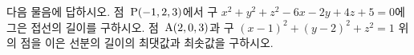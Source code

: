 다음 물음에 답하시오.
 점~$\mathrm{P}(-1{,}\mkern3mu\mathopen{}2{,}\mkern3mu\mathopen{}3)$에서 구 $x^2+y^2+z^2-6x-2y+4z+5=0$에 그은 접선의 길이를 구하시오.
 점~$\mathrm{A}(2{,}\mkern3mu\mathopen{}0{,}\mkern3mu\mathopen{}3)$과 구 $(x-1)^2+(y-2)^2+z^2=1$ 위의 점을 이은 선분의 길이의 최댓값과 최솟값을 구하시오.
